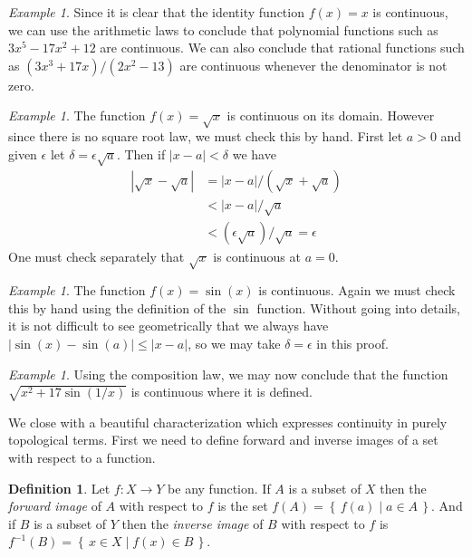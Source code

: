 \documentclass[11pt,oneside]{amsbook}
\newcommand{\set}[1]{\left\{\,#1\,\right\}}
\theoremstyle{definition}
\theoremstyle{plain}
\theoremstyle{definition}
\newtheorem{definition}[theorem]{Definition}
\theoremstyle{remark}
\newtheorem{example}[theorem]{Example}
\numberwithin{equation}{section}
\numberwithin{figure}{section}
\begin{document}
\begin{example}
  Since it is clear that the identity function $f(x)=x$ is continuous, we can use the arithmetic laws to conclude that polynomial functions such as $3x^5-17x^2+12$ are continuous. We can also conclude that rational functions such as $(3x^3+17x)/(2x^2-13)$ are continuous whenever the denominator is not zero.
\end{example}

\begin{example}
  The function $f(x)=\sqrt{x}$ is continuous on its domain. However since there is no square root law, we must check this by hand. First let $a>0$ and given $\epsilon$ let $\delta=\epsilon\sqrt{a}$. Then if $|x-a|<\delta$ we have
  \begin{align*}
    |\sqrt{x}-\sqrt{a}|&=|x-a|/(\sqrt{x}+\sqrt{a})\\
                       &<|x-a|/\sqrt{a}\\
                       &<(\epsilon\sqrt{a})/\sqrt{a}=\epsilon
  \end{align*}
  One must check separately that $\sqrt{x}$ is continuous at $a=0$.
\end{example}

\begin{example}
  The function $f(x)=\sin(x)$ is continuous. Again we must check this by hand using the definition of the $\sin$ function. Without going into details, it is not difficult to see geometrically that we always have $|\sin(x)-\sin(a)|\leq|x-a|$, so we may take $\delta=\epsilon$ in this proof.
\end{example}

\begin{example}
  Using the composition law, we may now conclude that the function $\sqrt{x^2+17\sin(1/x)}$ is continuous where it is defined.
\end{example}

We close with a beautiful characterization which expresses continuity in purely topological terms. First we need to define forward and inverse images of a set with respect to a function.

\begin{definition}
  Let $f\colon X\to Y$ be any function. If $A$ is a subset of $X$ then the \emph{forward image} of $A$ with respect to $f$ is the set $f(A)=\set{f(a)\mid a\in A}$. And if $B$ is a subset of $Y$ then the \emph{inverse image} of $B$ with respect to $f$ is $f^{-1}(B)=\set{x\in X\mid f(x)\in B}$.
\end{definition}
\end{document}
